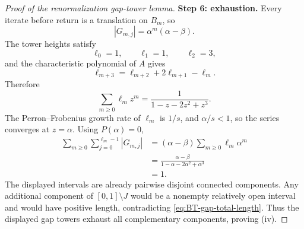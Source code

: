 \documentclass[11pt]{amsart}
\theoremstyle{plain}
\theoremstyle{definition}
\theoremstyle{remark}
\begin{document}
\begin{proof}[Proof of the renormalization gap-tower lemma]
\smallskip
\noindent
\textbf{Step 6: exhaustion.}
Every iterate before return is a translation on \(B_m\), so
\[
        |G_{m,j}|=\alpha^m(\alpha-\beta).
\tag{C.11}
\label{eq:BT-gap-length}
\]
The tower heights satisfy
\[
        \ell_0=1,\qquad
        \ell_1=1,\qquad
        \ell_2=3,
\]
and the characteristic polynomial of \(A\) gives
\[
        \ell_{m+3}
        =
        \ell_{m+2}+2\ell_{m+1}-\ell_m.
\tag{C.12}
\label{eq:BT-height-recurrence}
\]
Therefore
\[
        \sum_{m\geq0}\ell_mz^m
        =
        \frac{1}{1-z-2z^2+z^3}.
\tag{C.13}
\label{eq:BT-height-generating}
\]
The Perron--Frobenius growth rate of \(\ell_m\) is \(1/s\), and
\(\alpha/s<1\), so the series converges at \(z=\alpha\). Using
\(P(\alpha)=0\),
\[
\begin{aligned}
\sum_{m\geq0}\sum_{j=0}^{\ell_m-1}|G_{m,j}|
&=
(\alpha-\beta)\sum_{m\geq0}\ell_m\alpha^m\\
&=
\frac{\alpha-\beta}{1-\alpha-2\alpha^2+\alpha^3}\\
&=
1.
\end{aligned}
\tag{C.14}
\label{eq:BT-gap-total-length}
\]
The displayed intervals are already pairwise disjoint connected components. Any additional
component of \([0,1]\setminus J\) would be a nonempty relatively open interval and would have
positive length, contradicting \eqref{eq:BT-gap-total-length}. Thus the displayed gap towers
exhaust all complementary components, proving \textup{(iv)}.
\end{proof}
\end{document}
